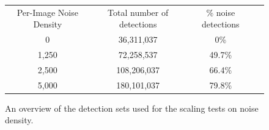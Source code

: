 \begin{figure}[ht!]
\centering

\begin{tabular}{|c c c c|}
\hline
Per-Image Noise Density & Total number of detections & \% noise detections &  \\ 
0             & 36,311,037             & 0\%                          & \\
1,250         & 72,258,537             & 49.7\%          & \\
2,500         & 108,206,037            & 66.4\%          & \\ 
5,000         & 180,101,037            & 79.8\%          & \\
\hline
\end{tabular}
\caption[Input data for runs with noise.]{An overview of the detection sets used for the scaling tests on noise density.}
\label{noiseScaling_detections}
\end{figure}

